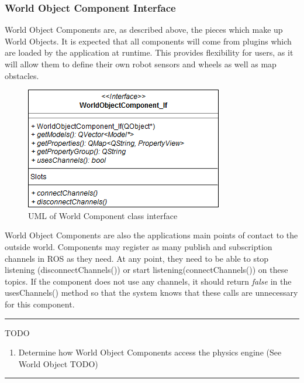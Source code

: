   \subsubsection*{World Object Component Interface}
  World Object Components are, as described above, the pieces which make up World Objects. It is expected that all components will come from plugins which are loaded by the application at runtime. This provides flexibility for users, as it will allow them to define their own robot sensors and wheels as well as map obstacles.
 \begin{figure}
 	\begin{center}
 	\includegraphics[scale=0.5]{./images_design/uml/WorldComponent_If}
 	\caption{UML of World Component class interface\label{uml:worldcomponent_if}}
 	\end{center}
 \end{figure} 
 World Object Components are also the applications main points of contact to the outside world. Components may register as many publish and subscription channels in ROS as they need. At any point, they need to be able to stop listening (disconnectChannels()) or start listening(connectChannels()) on these topics. If the component does not use any channels, it should return \textit{false} in the usesChannels() method so that the system knows that these calls are unnecessary for this component.
 \hrule
 TODO
 \begin{enumerate}
 	\item Determine how World Object Components access the physics engine (See World Object TODO)
 \end{enumerate}
 \hrule

